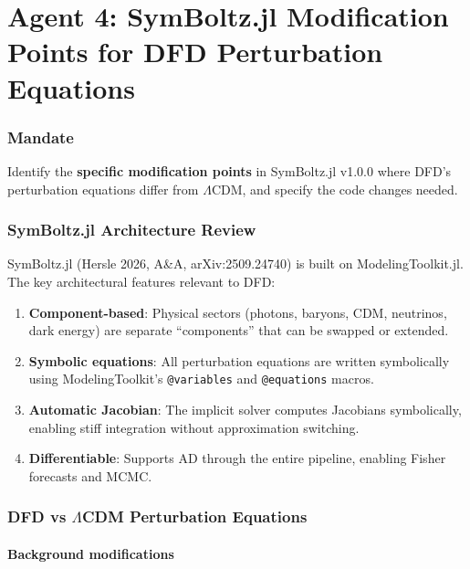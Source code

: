 \documentclass[11pt,a4paper]{article}
\begin{document}
\part{Agent 4: SymBoltz.jl Modification Points for DFD Perturbation Equations}
\label{part:agent4}

\section{Mandate}

Identify the \textbf{specific modification points} in SymBoltz.jl v1.0.0 where DFD's perturbation equations differ from $\Lambda$CDM, and specify the code changes needed.

\section{SymBoltz.jl Architecture Review}

SymBoltz.jl (Hersle 2026, A\&A, arXiv:2509.24740) is built on ModelingToolkit.jl. The key architectural features relevant to DFD:

\begin{enumerate}
\item \textbf{Component-based}: Physical sectors (photons, baryons, CDM, neutrinos, dark energy) are separate ``components'' that can be swapped or extended.
\item \textbf{Symbolic equations}: All perturbation equations are written symbolically using ModelingToolkit's \texttt{@variables} and \texttt{@equations} macros.
\item \textbf{Automatic Jacobian}: The implicit solver computes Jacobians symbolically, enabling stiff integration without approximation switching.
\item \textbf{Differentiable}: Supports AD through the entire pipeline, enabling Fisher forecasts and MCMC.
\end{enumerate}

\section{DFD vs $\Lambda$CDM Perturbation Equations}

\subsection{Background modifications}
\end{document}
